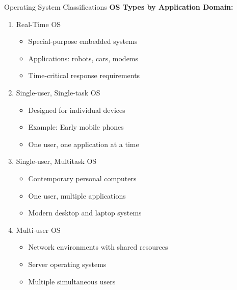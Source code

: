 \documentclass[aspectratio=169]{beamer}
\begin{document}
\begin{frame}{Operating System Classifications}
    \textbf{OS Types by Application Domain:}
    
    \begin{enumerate}
        \item Real-Time OS
        \begin{itemize}
            \item Special-purpose embedded systems
            \item Applications: robots, cars, modems
            \item Time-critical response requirements
        \end{itemize}
        
        \item Single-user, Single-task OS
        \begin{itemize}
            \item Designed for individual devices
            \item Example: Early mobile phones
            \item One user, one application at a time
        \end{itemize}
        
        \item Single-user, Multitask OS
        \begin{itemize}
            \item Contemporary personal computers
            \item One user, multiple applications
            \item Modern desktop and laptop systems
        \end{itemize}
        
        \item Multi-user OS
        \begin{itemize}
            \item Network environments with shared resources
            \item Server operating systems
            \item Multiple simultaneous users
        \end{itemize}
    \end{enumerate}
\end{frame}
\end{document}
